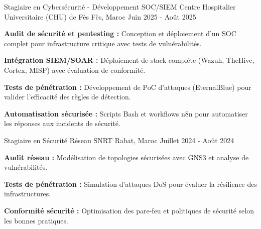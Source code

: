
\begin{cventries}

    \cventry
    {Stagiaire en Cybersécurité - Développement SOC/SIEM} %
    {Centre Hospitalier Universitaire (CHU) de Fès} %
    {Fès, Maroc} %
    {Juin 2025 - Août 2025} %
    {
        \begin{cvitems}
            \item {
                        \textbf{Audit de sécurité et pentesting :} Conception et déploiement d'un SOC complet pour infrastructure critique avec tests de vulnérabilités.}
            \item {
                        \textbf{Intégration SIEM/SOAR :} Déploiement de stack complète (Wazuh, TheHive, Cortex, MISP) avec évaluation de conformité.}
            \item {
                        \textbf{Tests de pénétration :} Développement de PoC d'attaques (EternalBlue) pour valider l'efficacité des règles de détection.}
            \item {
                        \textbf{Automatisation sécurisée :} Scripts Bash et workflows n8n pour automatiser les réponses aux incidents de sécurité.}
        \end{cvitems}
    }

    \cventry
    {Stagiaire en Sécurité Réseau} %
    {SNRT} %
    {Rabat, Maroc} %
    {Juillet 2024 - Août 2024} %
    {
        \begin{cvitems} %
            \item {\textbf{Audit réseau :} Modélisation de topologies sécurisées avec GNS3 et analyse de vulnérabilités.}
            \item {\textbf{Tests de pénétration :} Simulation d'attaques DoS pour évaluer la résilience des infrastructures.}
            \item {\textbf{Conformité sécurité :} Optimisation des pare-feu et politiques de sécurité selon les bonnes pratiques.}
        \end{cvitems}
    }


\end{cventries}
